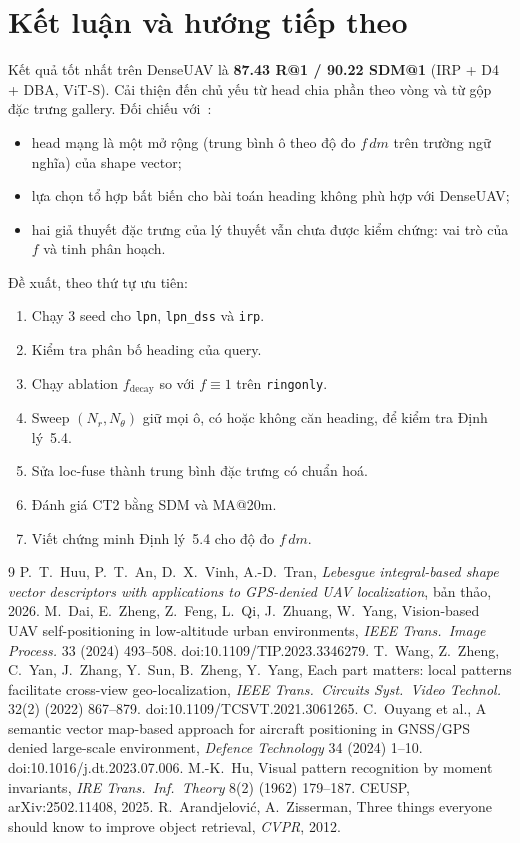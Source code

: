 \documentclass[11pt,a4paper]{article}
\newcommand{\run}[1]{\texttt{#1}}
\begin{document}
\section{Kết luận và hướng tiếp theo}
Kết quả tốt nhất trên DenseUAV là \textbf{87.43 R@1 / 90.22 SDM@1} (IRP + D4 + DBA, ViT-S). Cải thiện đến chủ yếu từ head chia phần theo vòng và từ gộp đặc trưng gallery. Đối chiếu với~\cite{huu2026}:
\begin{itemize}
\item head mạng là một mở rộng (trung bình ô theo độ đo $f\,dm$ trên trường ngữ nghĩa) của shape vector;
\item lựa chọn tổ hợp bất biến cho bài toán heading không phù hợp với DenseUAV;
\item hai giả thuyết đặc trưng của lý thuyết vẫn chưa được kiểm chứng: vai trò của $f$ và tinh phân hoạch.
\end{itemize}
Đề xuất, theo thứ tự ưu tiên:
\begin{enumerate}
\item Chạy 3 seed cho \run{lpn}, \run{lpn\_dss} và \run{irp}.
\item Kiểm tra phân bố heading của query.
\item Chạy ablation $f_{\mathrm{decay}}$ so với $f\equiv1$ trên \run{ringonly}.
\item Sweep $(N_r,N_\theta)$ giữ mọi ô, có hoặc không căn heading, để kiểm tra Định lý~5.4.
\item Sửa loc-fuse thành trung bình đặc trưng có chuẩn hoá.
\item Đánh giá CT2 bằng SDM và MA@20m.
\item Viết chứng minh Định lý~5.4 cho độ đo $f\,dm$.
\end{enumerate}

\begin{thebibliography}{9}\small
{} P.~T.~Huu, P.~T.~An, D.~X.~Vinh, A.-D.~Tran, \emph{Lebesgue integral-based shape vector descriptors with applications to GPS-denied UAV localization}, bản thảo, 2026.
 M.~Dai, E.~Zheng, Z.~Feng, L.~Qi, J.~Zhuang, W.~Yang, Vision-based UAV self-positioning in low-altitude urban environments, \emph{IEEE Trans.\ Image Process.} 33 (2024) 493--508. doi:10.1109/TIP.2023.3346279.
 T.~Wang, Z.~Zheng, C.~Yan, J.~Zhang, Y.~Sun, B.~Zheng, Y.~Yang, Each part matters: local patterns facilitate cross-view geo-localization, \emph{IEEE Trans.\ Circuits Syst.\ Video Technol.} 32(2) (2022) 867--879. doi:10.1109/TCSVT.2021.3061265.
 C.~Ouyang et al., A semantic vector map-based approach for aircraft positioning in GNSS/GPS denied large-scale environment, \emph{Defence Technology} 34 (2024) 1--10. doi:10.1016/j.dt.2023.07.006.
 M.-K.~Hu, Visual pattern recognition by moment invariants, \emph{IRE Trans.\ Inf.\ Theory} 8(2) (1962) 179--187.
 CEUSP, arXiv:2502.11408, 2025.
 R.~Arandjelović, A.~Zisserman, Three things everyone should know to improve object retrieval, \emph{CVPR}, 2012.
\end{thebibliography}
\end{document}
